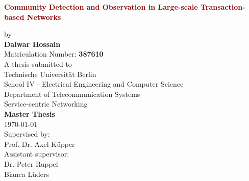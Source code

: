 \begin{titlepage}
	\strut
	\hfill
	\begin{center}
	\vspace{1cm}
		\Huge
		\begin{spacing}{.9}
			\textcolor{DarkRed}{\textbf{Community Detection and Observation in Large-scale Transaction-based Networks}}\\
		\end{spacing}
		\vspace{0.8cm}
		\large
		by\\
		\vspace{0.8cm}
		\textbf{Dalwar Hossain}\\
		\vspace{0.2cm}
		Matriculation Number: \textbf{387610}\\
		\vspace{2cm}
	 	A thesis submitted to\\
		\vspace{0.5cm}
		Technische Universität Berlin\\
		School IV - Electrical Engineering and Computer Science\\
		Department of Telecommunication Systems\\
		Service-centric Networking\\
		\vspace{0.8cm}
		\textbf{Master Thesis}\\
		\vspace{1.8cm}
		\today\\
		\vspace{1.8cm}
		\large
		Supervised by:\\
		Prof. Dr. Axel Küpper\\
		\vspace{1cm}
		Assistant supervisor:\\
		Dr. Peter Ruppel\\
		Bianca Lüders\\
		\end{center}
\end{titlepage}

\shipout\null
\shipout\null
